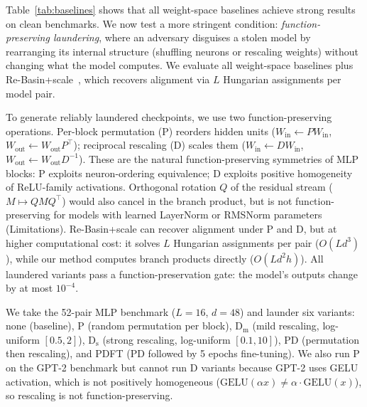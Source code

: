 Table~\ref{tab:baselines} shows that all weight-space baselines achieve strong results on clean benchmarks. We now test a more stringent condition: \emph{function-preserving laundering}, where an adversary disguises a stolen model by rearranging its internal structure (shuffling neurons or rescaling weights) without changing what the model computes. We evaluate all weight-space baselines plus Re-Basin+scale~\citep{ainsworth2023git}, which recovers alignment via $L$ Hungarian assignments per model pair.

To generate reliably laundered checkpoints, we use two function-preserving operations. Per-block permutation (P) reorders hidden units ($W_{\mathrm{in}} \leftarrow P W_{\mathrm{in}}$, $W_{\mathrm{out}} \leftarrow W_{\mathrm{out}} P^\top$); reciprocal rescaling (D) scales them ($W_{\mathrm{in}} \leftarrow D W_{\mathrm{in}}$, $W_{\mathrm{out}} \leftarrow W_{\mathrm{out}} D^{-1}$). These are the natural function-preserving symmetries of MLP blocks: P exploits neuron-ordering equivalence; D exploits positive homogeneity of ReLU-family activations. Orthogonal rotation $Q$ of the residual stream ($M \mapsto QMQ^\top$) would also cancel in the branch product, but is not function-preserving for models with learned LayerNorm or RMSNorm parameters (Limitations). Re-Basin+scale can recover alignment under P and D, but at higher computational cost: it solves $L$ Hungarian assignments per pair ($O(Ld^3)$), while our method computes branch products directly ($O(Ld^2 h)$). All laundered variants pass a function-preservation gate: the model's outputs change by at most $10^{-4}$.

We take the 52-pair MLP benchmark ($L{=}16$, $d{=}48$) and launder six variants: none (baseline), P (random permutation per block), D$_\mathrm{m}$ (mild rescaling, log-uniform $[0.5,2]$), D$_\mathrm{s}$ (strong rescaling, log-uniform $[0.1,10]$), PD (permutation then rescaling), and PDFT (PD followed by 5 epochs fine-tuning). We also run P on the GPT-2 benchmark but cannot run D variants because GPT-2 uses GELU activation, which is not positively homogeneous ($\mathrm{GELU}(\alpha x) \neq \alpha \cdot \mathrm{GELU}(x)$), so rescaling is not function-preserving.

